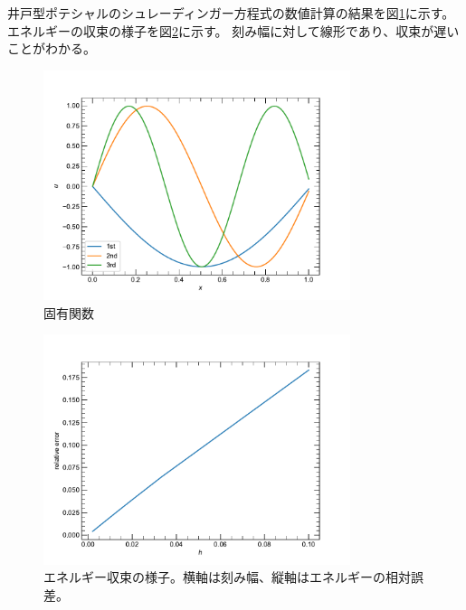 \documentclass[xelatex,ja=standard]{bxjsarticle}
\begin{document}
井戸型ポテシャルのシュレーディンガー方程式の数値計算の結果を図\ref{fig:eigenfunction}に示す。
エネルギーの収束の様子を図\ref{fig:convergence}に示す。
刻み幅に対して線形であり、収束が遅いことがわかる。

\begin{figure}
    \centering
    \includegraphics[width=0.8\textwidth]{./figs/eigenfunction.pdf}
    \caption{固有関数}
    \label{fig:eigenfunction}
\end{figure}
\begin{figure}
    \centering
    \includegraphics[width=0.8\textwidth]{./figs/convergence.pdf}
    \caption{エネルギー収束の様子。横軸は刻み幅、縦軸はエネルギーの相対誤差。}
    \label{fig:convergence}
\end{figure}
\end{document}
